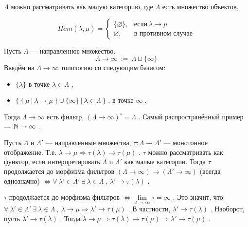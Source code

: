 \( \Lambda \) можно рассматривать как малую категорию, где \( \Lambda \) есть множество объектов,

\[ Hom(\lambda,\mu)=
   \begin{cases}
   \{\varnothing\}, & \text{если} ~\lambda \rightarrow \mu \\
   \varnothing    , & \text{в противном случае}
   \end{cases}
\]

\pagebreak

\SSsect[def] Пусть \( \Lambda \) --- направленное множество.
\[ \Lambda \rightarrow \infty ~:=~ \Lambda \sqcup \{\infty\} \]
Введём на \( \Lambda \rightarrow \infty \) топологию со следующим базисом:
\begin{itemize}[label=]
\item \( \{\lambda\} \) в точке \( \lambda \in \Lambda \) ,
\item \( \{~\{~\mu~|~\lambda\rightarrow\mu~\} \cup \{\infty\} ~|~ \lambda \in \Lambda ~\} \) , в точке \( \infty \) .
\end{itemize}
Тогда \( \Lambda \rightarrow \infty \) есть фильтр, \( (\Lambda \rightarrow \infty)^\circ=\Lambda \) . Самый распространённый пример --- \( \mathbb{N} \rightarrow \infty \) .

\SSsect Пусть \( \Lambda \) и \( \Lambda' \) --- направленные множества, \( \tau: \Lambda \rightarrow \Lambda' \) --- монотонное отображение. Т.е. \( \lambda \rightarrow \mu \Rightarrow \tau(\lambda) \rightarrow \tau(\mu) \) . \( \tau \) можно рассматривать как функтор, если интерпретировать \( \Lambda \) и \( \Lambda' \) как малые категории.
Тогда \( \tau \) продолжается до морфизма фильтров \( (\Lambda \rightarrow \infty) \rightarrow (\Lambda' \rightarrow \infty) \) (всегда однозначно) \( \Leftrightarrow  \forall~\lambda' \in \Lambda' ~\exists~\lambda \in \Lambda ~,~ \lambda' \rightarrow \tau(\lambda) \) .

\SSproof

\( \tau \) продолжается до морфизма фильтров \( \Leftrightarrow \lim\limits_{\Lambda \rightarrow \infty} \tau = \infty \) . Это значит, что \( \forall~\lambda' \in \Lambda' ~\exists~\lambda \in \Lambda ~,~ \lambda \rightarrow \mu \Rightarrow \lambda' \rightarrow \tau(\mu) \) . В частности, \( \lambda' \rightarrow \tau(\lambda) \) . Наоборот, пусть \( \lambda' \rightarrow \tau(\lambda) \) . Тогда \( \lambda \rightarrow \mu \Rightarrow \tau(\lambda) \rightarrow \tau(\mu) \Rightarrow \lambda' \rightarrow \tau(\mu) \) .

\SSendp

